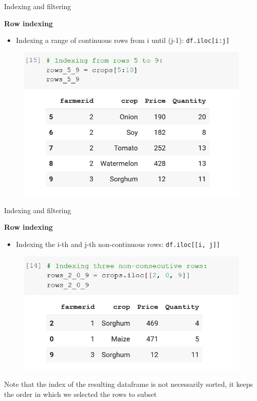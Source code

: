 \documentclass[aspectratio=169]{beamer}
\begin{document}
\begin{frame}{Indexing and filtering}

	\textbf{Row indexing}

	\begin{itemize}
		\item Indexing a range of continuous rows from i until (j-1): \texttt{df.iloc[i:j]}
	\end{itemize}

	\begin{figure}
		\centering
		\includegraphics[width=0.5\linewidth]{img/consecutive_rows.png}
	\end{figure}

\end{frame}

\begin{frame}{Indexing and filtering}

	\textbf{Row indexing}

	\begin{itemize}
		\item Indexing the i-th and j-th non-continuous rows: \texttt{df.iloc[[i, j]]}
	\end{itemize}

	\begin{figure}
		\centering
		\includegraphics[width=0.5\linewidth]{img/non-consecutive_rows.png}
	\end{figure}

	Note that the index of the resulting dataframe is not necessarily sorted, it keeps the order in which we selected the rows to subset

\end{frame}
\end{document}
